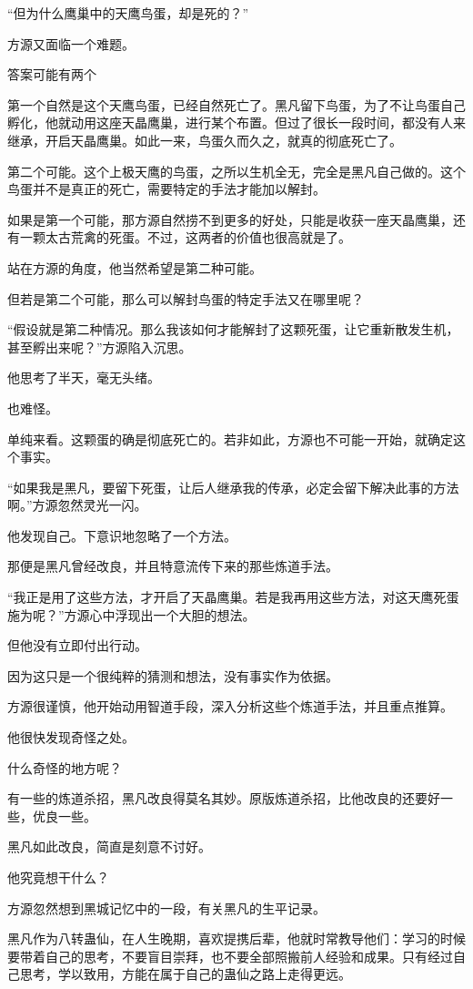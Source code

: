 \begin{this_body}
“但为什么鹰巢中的天鹰鸟蛋，却是死的？”

方源又面临一个难题。

答案可能有两个

第一个自然是这个天鹰鸟蛋，已经自然死亡了。黑凡留下鸟蛋，为了不让鸟蛋自己孵化，他就动用这座天晶鹰巢，进行某个布置。但过了很长一段时间，都没有人来继承，开启天晶鹰巢。如此一来，鸟蛋久而久之，就真的彻底死亡了。

第二个可能。这个上极天鹰的鸟蛋，之所以生机全无，完全是黑凡自己做的。这个鸟蛋并不是真正的死亡，需要特定的手法才能加以解封。

如果是第一个可能，那方源自然捞不到更多的好处，只能是收获一座天晶鹰巢，还有一颗太古荒禽的死蛋。不过，这两者的价值也很高就是了。

站在方源的角度，他当然希望是第二种可能。

但若是第二个可能，那么可以解封鸟蛋的特定手法又在哪里呢？

“假设就是第二种情况。那么我该如何才能解封了这颗死蛋，让它重新散发生机，甚至孵出来呢？”方源陷入沉思。

他思考了半天，毫无头绪。

也难怪。

单纯来看。这颗蛋的确是彻底死亡的。若非如此，方源也不可能一开始，就确定这个事实。

“如果我是黑凡，要留下死蛋，让后人继承我的传承，必定会留下解决此事的方法啊。”方源忽然灵光一闪。

他发现自己。下意识地忽略了一个方法。

那便是黑凡曾经改良，并且特意流传下来的那些炼道手法。

“我正是用了这些方法，才开启了天晶鹰巢。若是我再用这些方法，对这天鹰死蛋施为呢？”方源心中浮现出一个大胆的想法。

但他没有立即付出行动。

因为这只是一个很纯粹的猜测和想法，没有事实作为依据。

方源很谨慎，他开始动用智道手段，深入分析这些个炼道手法，并且重点推算。

他很快发现奇怪之处。

什么奇怪的地方呢？

有一些的炼道杀招，黑凡改良得莫名其妙。原版炼道杀招，比他改良的还要好一些，优良一些。

黑凡如此改良，简直是刻意不讨好。

他究竟想干什么？

方源忽然想到黑城记忆中的一段，有关黑凡的生平记录。

黑凡作为八转蛊仙，在人生晚期，喜欢提携后辈，他就时常教导他们：学习的时候要带着自己的思考，不要盲目崇拜，也不要全部照搬前人经验和成果。只有经过自己思考，学以致用，方能在属于自己的蛊仙之路上走得更远。


\end{this_body}
